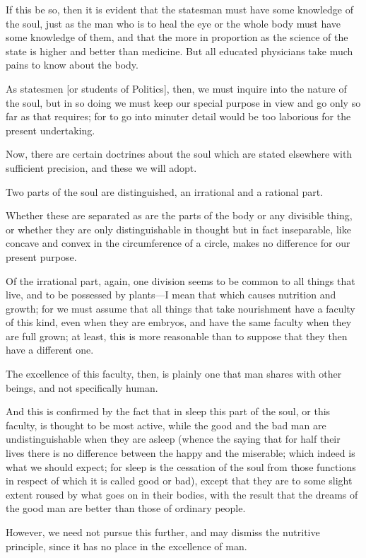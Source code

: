 If this be so, then it is evident that the statesman must have some
knowledge of the soul, just as the man who is to heal the eye or the
whole body must have some knowledge of them, and that the more in
proportion as the science of the state is higher and better than
medicine. But all educated physicians take much pains to know about
the body.

As statesmen [or students of Politics], then, we  must
inquire into the nature of the soul, but in so doing we must keep our
special purpose in view and go only so far as that requires; for to go
into minuter detail would be too laborious for the present
undertaking.

Now, there are certain doctrines about the soul which are stated
elsewhere with sufficient precision, and these we will adopt.

Two parts of the soul are distinguished, an irrational and a rational
part.

Whether these are separated as are the parts of the body or any
divisible thing, or whether they are only distinguishable in thought
but in fact inseparable, like concave and convex in the circumference
of a circle, makes no difference for our present purpose.

Of the irrational part, again, one division seems to be common to all
things that live, and to be possessed by plants---I mean that which
causes nutrition and growth; for we must assume that all things that
take nourishment have a faculty of this kind, even when they are
embryos, and have the same faculty when they are full grown; at least,
this is more reasonable than to suppose that they then have a
different one.

The excellence of this faculty, then, is plainly one that man shares
with other beings, and not specifically human.

And this is confirmed by the fact that in sleep this part of the soul,
or this faculty, is thought to be most active, while the good and the
bad man are undistinguishable when they are asleep (whence the saying
that for half their lives there is no difference between the happy and
the miserable; which  indeed is what we should expect; for
sleep is the cessation of the soul from those functions in respect of
which it is called good or bad), except that they are to some slight
extent roused by what goes on in their bodies, with the result that
the dreams of the good man are better than those of ordinary people.

However, we need not pursue this further, and may dismiss the
nutritive principle, since it has no place in the excellence of man.

